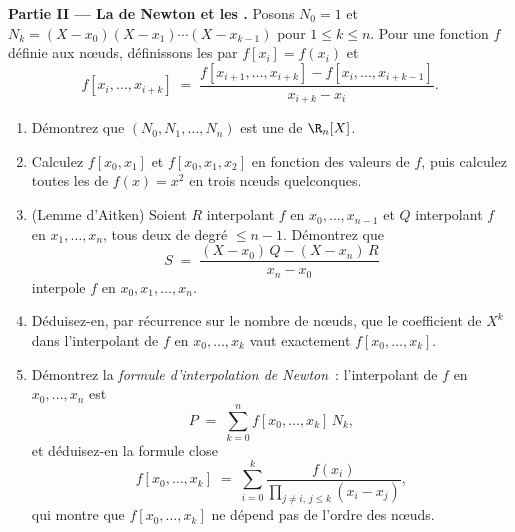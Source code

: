 \begin{problem}
\medskip
\noindent\textbf{Partie II --- La  de Newton et les .} Posons $N_0 = 1$ et $N_k = (X - x_0)(X - x_1) \cdots
(X - x_{k-1})$ pour $1 \leq k \leq n$. Pour une fonction $f$ définie
aux nœuds, définissons les \emph{} par
$f[x_i] = f(x_i)$ et
\[
f[x_i, \dots, x_{i+k}] \;=\;
\frac{f[x_{i+1}, \dots, x_{i+k}] - f[x_i, \dots, x_{i+k-1}]}
{x_{i+k} - x_i} .
\]
\begin{enumerate}[resume]
  \item Démontrez que $(N_0, N_1, \dots, N_n)$ est une  de
        $\R_n[X]$.
  \item Calculez $f[x_0, x_1]$ et $f[x_0, x_1, x_2]$ en fonction des
        valeurs de $f$, puis calculez toutes les 
        de $f(x) = x^2$ en trois nœuds quelconques.
  \item (Lemme d'Aitken) Soient $R$ interpolant $f$ en $x_0, \dots,
        x_{n-1}$ et $Q$ interpolant $f$ en $x_1, \dots, x_n$,
        tous deux de degré $\leq n - 1$. Démontrez que
        \[
        S \;=\; \frac{(X - x_0)\,Q - (X - x_n)\,R}{x_n - x_0}
        \]
        interpole $f$ en $x_0, x_1, \dots, x_n$.
  \item Déduisez-en, par récurrence sur le nombre de nœuds, que le
        coefficient de $X^{k}$ dans l'interpolant de $f$ en $x_0,
        \dots, x_k$ vaut exactement $f[x_0, \dots, x_k]$.
  \item Démontrez la \emph{formule d'interpolation de Newton}~:
        l'interpolant de $f$ en $x_0, \dots, x_n$ est
        \[
        P \;=\; \sum_{k=0}^{n} f[x_0, \dots, x_k]\, N_k ,
        \]
        et déduisez-en la formule close
        \[
        f[x_0, \dots, x_k] \;=\; \sum_{i=0}^{k}
        \frac{f(x_i)}{\prod_{j \neq i,\, j \leq k} (x_i - x_j)} ,
        \]
        qui montre que $f[x_0, \dots, x_k]$ ne dépend pas de l'ordre
        des nœuds.
\end{enumerate}


\end{problem}
